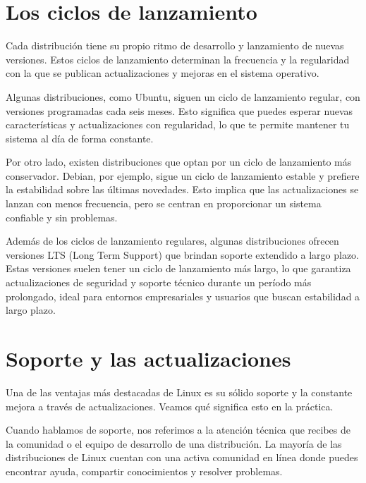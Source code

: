 \documentclass[
  a4paper,
]{article}
\begin{document}
\hypertarget{los-ciclos-de-lanzamiento}{%
\section{Los ciclos de lanzamiento}\label{los-ciclos-de-lanzamiento}}

Cada distribución tiene su propio ritmo de desarrollo y lanzamiento de
nuevas versiones. Estos ciclos de lanzamiento determinan la frecuencia y
la regularidad con la que se publican actualizaciones y mejoras en el
sistema operativo.

Algunas distribuciones, como Ubuntu, siguen un ciclo de lanzamiento
regular, con versiones programadas cada seis meses. Esto significa que
puedes esperar nuevas características y actualizaciones con regularidad,
lo que te permite mantener tu sistema al día de forma constante.

Por otro lado, existen distribuciones que optan por un ciclo de
lanzamiento más conservador. Debian, por ejemplo, sigue un ciclo de
lanzamiento estable y prefiere la estabilidad sobre las últimas
novedades. Esto implica que las actualizaciones se lanzan con menos
frecuencia, pero se centran en proporcionar un sistema confiable y sin
problemas.

Además de los ciclos de lanzamiento regulares, algunas distribuciones
ofrecen versiones LTS (Long Term Support) que brindan soporte extendido
a largo plazo. Estas versiones suelen tener un ciclo de lanzamiento más
largo, lo que garantiza actualizaciones de seguridad y soporte técnico
durante un período más prolongado, ideal para entornos empresariales y
usuarios que buscan estabilidad a largo plazo.

\hypertarget{soporte-y-las-actualizaciones}{%
\section{Soporte y las
actualizaciones}\label{soporte-y-las-actualizaciones}}

Una de las ventajas más destacadas de Linux es su sólido soporte y la
constante mejora a través de actualizaciones. Veamos qué significa esto
en la práctica.

Cuando hablamos de soporte, nos referimos a la atención técnica que
recibes de la comunidad o el equipo de desarrollo de una distribución.
La mayoría de las distribuciones de Linux cuentan con una activa
comunidad en línea donde puedes encontrar ayuda, compartir conocimientos
y resolver problemas.
\end{document}
